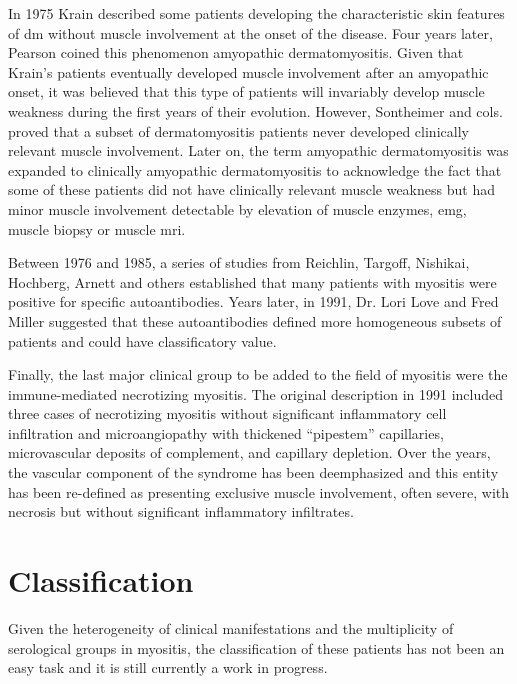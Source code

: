In 1975 Krain\cite{Krain1975} described some patients developing the characteristic skin features of \gls{dm} without muscle involvement at the onset of the disease. Four years later, Pearson coined this phenomenon amyopathic dermatomyositis.\cite{Pearson1979} Given that Krain’s patients eventually developed muscle involvement after an amyopathic onset, it was believed that this type of patients will invariably develop muscle weakness during the first years of their evolution. However, Sontheimer and cols. proved that a subset of dermatomyositis patients never developed clinically relevant muscle involvement.\cite{Euwer1991} Later on, the term amyopathic dermatomyositis was expanded to clinically amyopathic dermatomyositis to acknowledge the fact that some of these patients did not have clinically relevant muscle weakness but had minor muscle involvement detectable by elevation of muscle enzymes, \gls{emg}, muscle biopsy or muscle \gls{mri}.\cite{Sontheimer2002}

Between 1976 and 1985, a series of studies from Reichlin, Targoff, Nishikai, Hochberg, Arnett and others established that many patients with myositis were positive for specific autoantibodies.\cite{Nishikai1980,Targoff1985,Reichlin1976,Hochberg1984} Years later, in 1991, Dr. Lori Love and Fred Miller suggested that these autoantibodies defined more homogeneous subsets of patients and could have classificatory value.\cite{Love1991}

Finally, the last major clinical group to be added to the field of myositis were the immune-mediated necrotizing myositis. The original description in 1991\cite{EmslieSmith1991} included three cases of necrotizing myositis without significant inflammatory cell infiltration and microangiopathy with thickened “pipestem” capillaries, microvascular deposits of complement, and capillary depletion. Over the years, the vascular component of the syndrome has been deemphasized and this entity has been re-defined as presenting exclusive muscle involvement, often severe, with necrosis but without significant inflammatory infiltrates.

\section{Classification}

Given the heterogeneity of clinical manifestations and the multiplicity of serological groups in myositis, the classification of these patients has not been an easy task and it is still currently a work in progress.

